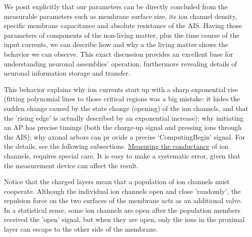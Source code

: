 We posit explicitly that our parameters can be directly concluded from the measurable parameters such as membrane surface size, its ion channel density, specific membrane capacitance and absolute resistance of the \gls{AIS}.
Having those parameters of components of the non-living matter, plus the time course of the input currents,
we can describe how and why a the living matter shows the behavior we can observe.
This exact discussion provides an excellent base for understanding neuronal assemblies' operation,
furthermore revealing details of neuronal information storage and transfer.


This behavior explains why ion currents
start up with a sharp exponential rise \cite{SodiumCurrentDelay:2006}
(fitting polynomial lines \cite{HodgkinHuxley:1952}
to those critical regions was a big mistake: it hides the sudden change
caused by the state change (opening) of the ion channels, and that
the 'rising edge' is actually described by an exponential increase); why initiating an \gls{AP} 
has precise timings (both the charge-up signal and pressing
ions through the \gls{AIS}); why axonal arbors can pr
ovide a precise
`ComputingBegin' signal. For the details, see the following subsections.
\hyperlink{electric_conductance}
{Measuring the conductance}
of ion channels, requires special care.
It is easy to make a systematic error, given that the measurement device can affect the result.

Notice that the charged layers mean that a population
of ion channels must cooperate. Although the individual
ion channels open and close 'randomly', the repulsion force
on the two surfaces of the membrane acts as an additional valve. In a statistical sense, some ion channels are open
after the population members received the 'open' signal,
but when they are open, only the ions in the proximal layer
can escape to the other side of the membrane.



